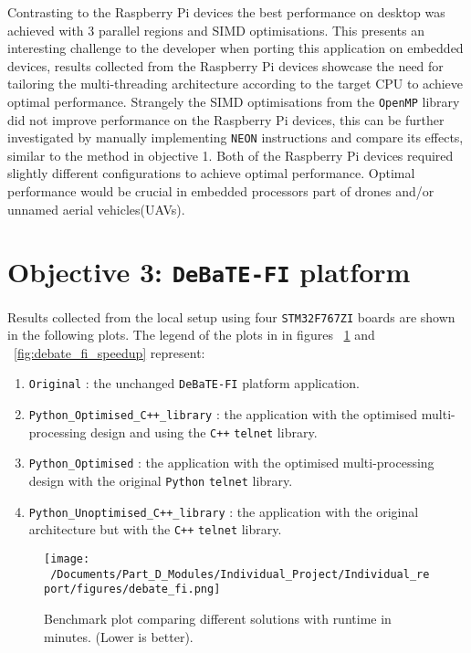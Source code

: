 Contrasting to the Raspberry Pi devices the best performance on desktop was achieved with 3 parallel regions and SIMD optimisations. This presents an interesting challenge to the developer when porting this application on embedded devices, results collected from the Raspberry Pi devices showcase the need for tailoring the multi-threading architecture according to the target CPU to achieve optimal performance. Strangely the SIMD optimisations from the \texttt{OpenMP} library did not improve performance on the Raspberry Pi devices, this can be further investigated by manually implementing \texttt{NEON} instructions and compare its effects, similar to the method in objective 1. Both of the Raspberry Pi devices required slightly different configurations to achieve optimal performance. Optimal performance would be crucial in embedded processors part of drones and/or unnamed aerial vehicles(UAVs)\cite{drones_UAV_MLDL}. 

\section{Objective 3: \texttt{DeBaTE-FI} platform}

Results collected from the local setup using four \texttt{STM32F767ZI} boards are shown in the following plots. The legend of the plots in in figures ~\ref{fig:debate_fi_plot} and ~\ref{fig:debate_fi_speedup} represent:

\begin{enumerate}
	\item \texttt{Original} : the unchanged \texttt{DeBaTE-FI} platform application. 
	\item \texttt{Python\_Optimised\_C++\_library} : the application with the optimised multi-processing design and using the \texttt{C++} \texttt{telnet} library.
	\item \texttt{Python\_Optimised} : the application with the optimised multi-processing design with the original \texttt{Python} \texttt{telnet} library.
	\item \texttt{Python\_Unoptimised\_C++\_library} : the application with the original architecture but with the \texttt{C++} \texttt{telnet} library.
\end{enumerate}

\begin{figure}[htbp] %
	\centering
	\texttt{[image: ~/Documents/Part\_D\_Modules/Individual\_Project/Individual\_report/figures/debate\_fi.png]} %
	\caption{Benchmark plot comparing different solutions with runtime in minutes. (Lower is better).}
	\label{fig:debate_fi_plot} %
\end{figure}

